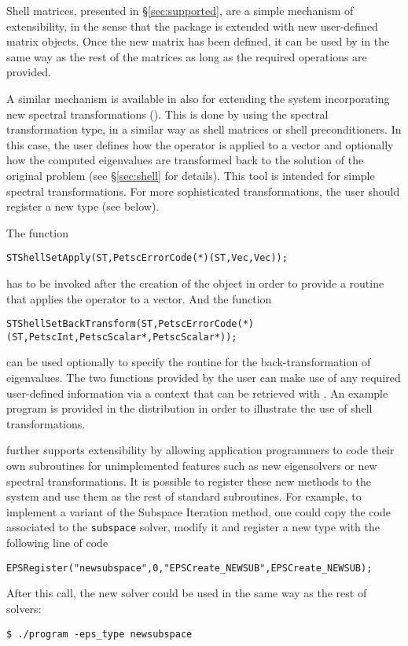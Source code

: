 	Shell matrices, presented in \S\ref{sec:supported}, are a simple mechanism of extensibility, in the sense that the package is extended with new user-defined matrix objects. Once the new matrix has been defined, it can be used by \slepc in the same way as the rest of the matrices as long as the required operations are provided.

	A similar mechanism is available in \slepc also for extending the system incorporating new spectral transformations (). This is done by using the  spectral transformation type, in a similar way as shell matrices or shell preconditioners. In this case, the user defines how the operator is applied to a vector and optionally how the computed eigenvalues are transformed back to the solution of the original problem (see \S\ref{sec:shell} for details). This tool is intended for simple spectral transformations. For more sophisticated transformations, the user should register a new  type (see below).

	The function
	\begin{Verbatim}[fontsize=\small]
      STShellSetApply(ST,PetscErrorCode(*)(ST,Vec,Vec));
	\end{Verbatim}
has to be invoked after the creation of the  object in order to provide a routine that applies the operator to a vector. And the function
	\begin{Verbatim}[fontsize=\small]
      STShellSetBackTransform(ST,PetscErrorCode(*)(ST,PetscInt,PetscScalar*,PetscScalar*));
	\end{Verbatim}
can be used optionally to specify the routine for the back-transformation of eigenvalues. The two functions provided by the user can make use of any required user-defined information via a context that can be retrieved with . An example program is provided in the \slepc distribution in order to illustrate the use of shell transformations.

	\slepc further supports extensibility by allowing application programmers to code their own subroutines for unimplemented features such as new eigensolvers or new spectral transformations. It is possible to register these new methods to the system and use them as the rest of standard subroutines. For example, to implement a variant of the Subspace Iteration method, one could copy the \slepc code associated to the \texttt{subspace} solver, modify it and register a new  type with the following line of code
	\begin{Verbatim}[fontsize=\small]
	EPSRegister("newsubspace",0,"EPSCreate_NEWSUB",EPSCreate_NEWSUB);
	\end{Verbatim}
After this call, the new solver could be used in the same way as the rest of \slepc solvers:
	\begin{Verbatim}[fontsize=\small]
	$ ./program -eps_type newsubspace
	\end{Verbatim}

